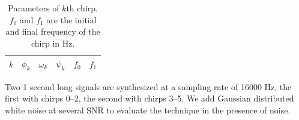\begin{table}[!b]
    \caption{Parameters of $k$th chirp. $f_{0}$ and $f_{1}$ are the initial and
    final frequency of the chirp in Hz. \label{tab:ptrackexamplechirpparams}}
    \begin{center}
        \begin{tabular}{l c c c c c}
            $k$ & $\phi_{k}$ & $\omega_{k}$ & $\psi_{k}$ & $f_{0}$ & $f_{1}$ \\
            \hline
            
        \end{tabular}
    \end{center}
\end{table}

Two 1 second long signals are synthesized at a sampling rate of 16000 Hz, the
first with chirps 0--2, the second with chirps 3--5. We add
Gaussian distributed white noise at several SNR to evaluate the technique in the
presence of noise.

